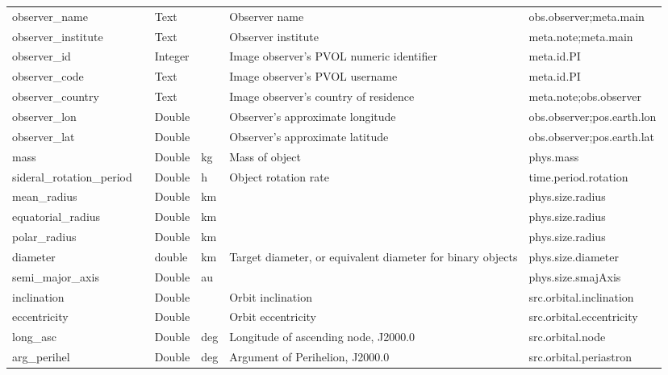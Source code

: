\documentclass[11pt,a4paper]{ivoa}
\begin{document}
\begin{longtable}{p{3.5cm}p{0.5cm}p{1cm}p{1cm}p{7cm}p{3cm}}
observer\_name&&Text&&Observer name&obs.observer;meta.main\\

observer\_institute&&Text&&Observer institute&meta.note;meta.main\\

observer\_id&&Integer&&Image observer's PVOL numeric identifier&meta.id.PI\\

observer\_code&&Text&&Image observer's PVOL username&meta.id.PI\\

observer\_country&&Text&&Image observer's country of residence&meta.note;obs.observer\\

observer\_lon&&Double&&Observer's approximate longitude&obs.observer;pos.earth.lon\\

observer\_lat&&Double&&Observer's approximate latitude&obs.observer;pos.earth.lat\\

mass&&Double&kg&Mass of object&phys.mass\\

sideral\_rotation\_period&&Double&h&Object rotation rate&time.period.rotation\\

mean\_radius&&Double&km&&phys.size.radius\\

equatorial\_radius&&Double&km&&phys.size.radius\\

polar\_radius&&Double&km&&phys.size.radius\\

diameter&&double&km&Target diameter, or equivalent diameter for binary objects&phys.size.diameter\\

semi\_major\_axis&&Double&au&&phys.size.smajAxis\\

inclination&&Double&&Orbit inclination&src.orbital.inclination\\

eccentricity&&Double&&Orbit eccentricity&src.orbital.eccentricity\\

long\_asc&&Double&deg&Longitude of ascending node, J2000.0&src.orbital.node\\

arg\_perihel&&Double&deg&Argument of Perihelion, J2000.0&src.orbital.periastron\\


\end{longtable}
\end{document}
